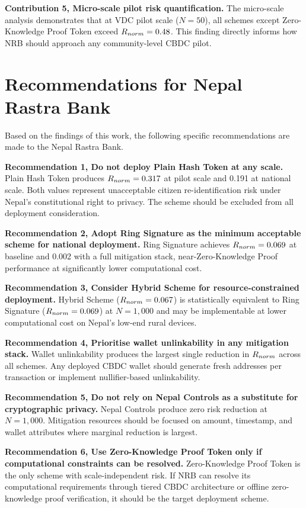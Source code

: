 \textbf{Contribution 5, Micro-scale pilot risk quantification.}
The micro-scale analysis demonstrates that at VDC pilot scale
($N = 50$), all schemes except Zero-Knowledge Proof Token exceed
$R_{norm} = 0.48$. This finding directly informs how NRB should
approach any community-level CBDC pilot.

\section{Recommendations for Nepal Rastra Bank}
\label{sec:nrb_recommendations}

Based on the findings of this work, the following specific
recommendations are made to the Nepal Rastra Bank.

\textbf{Recommendation 1, Do not deploy Plain Hash Token at
any scale.} Plain Hash Token produces $R_{norm} = 0.317$ at pilot
scale and 0.191 at national scale. Both values represent
unacceptable citizen re-identification risk under Nepal's
constitutional right to privacy. The scheme should be excluded
from all deployment consideration.

\textbf{Recommendation 2, Adopt Ring Signature as the minimum
acceptable scheme for national deployment.} Ring Signature
achieves $R_{norm} = 0.069$ at baseline and 0.002 with a full
mitigation stack, near-Zero-Knowledge Proof performance at significantly lower
computational cost.

\textbf{Recommendation 3, Consider Hybrid Scheme for
resource-constrained deployment.} Hybrid Scheme
($R_{norm} = 0.067$) is statistically equivalent to Ring Signature
($R_{norm} = 0.069$) at $N = 1{,}000$ and may be implementable at
lower computational cost on Nepal's low-end rural devices.

\textbf{Recommendation 4, Prioritise wallet unlinkability in
any mitigation stack.} Wallet unlinkability produces the largest
single reduction in $R_{norm}$ across all schemes. Any deployed
CBDC wallet should generate fresh addresses per transaction or
implement nullifier-based unlinkability.

\textbf{Recommendation 5, Do not rely on Nepal Controls as a
substitute for cryptographic privacy.} Nepal Controls produce
zero risk reduction at $N = 1{,}000$. Mitigation resources should
be focused on amount, timestamp, and wallet attributes where
marginal reduction is largest.

\textbf{Recommendation 6, Use Zero-Knowledge Proof Token only if computational
constraints can be resolved.} Zero-Knowledge Proof Token is the only scheme with
scale-independent risk. If NRB can resolve its computational
requirements through tiered CBDC architecture or offline zero-knowledge proof
verification, it should be the target deployment scheme.

